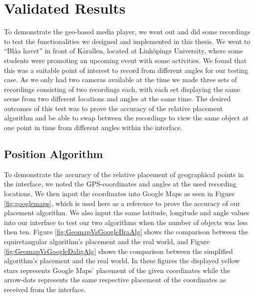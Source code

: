 \chapter{Validated Results}
\label{cha:results}

To demonstrate the geo-based media player, we went out and did some recordings to test the functionalities we designed and implemented in this thesis. We went to “Blåa havet” in front of Kårallen, located at Linköpings University, where some students were promoting an upcoming event with some activities. We found that this was a suitable point of interest to record from different angles for our testing case. As we only had two cameras available at the time we made three sets of recordings consisting of two recordings each, with each set displaying the same scene from two different locations and angles at the same time. The desired outcomes of this test was to prove the accuracy of the relative placement algorithm and be able to swap between the recordings to view the same object at one point in time from different angles within the interface.

\section{Position Algorithm}
\label{sec:positionalgorithm}

To demonstrate the accuracy of the relative placement of geographical points in the interface, we noted the GPS-coordinates and angles at the used recording locations. We then input the coordinates into Google Maps as seen in Figure \ref{fig:googlemaps}, which is used here as a reference to prove the accuracy of our placement algorithm. We also input the same latitude, longitude and angle values into our interface to test our two algorithms when the number of objects was less then ten. Figure \ref{fig:GeomapVsGoogleBraAlg} shows the comparison between the equiretangular algorithm's placement and the real world, and Figure \ref{fig:GeomapVsGoogleDaligAlg} shows the comparison between the simplified algorithm's placement and the real world. In these figures the displayed yellow stars represents Google Maps' placement of the given coordinates while the arrow-dots represents the same respective placement of the coordinates as received from the interface.


